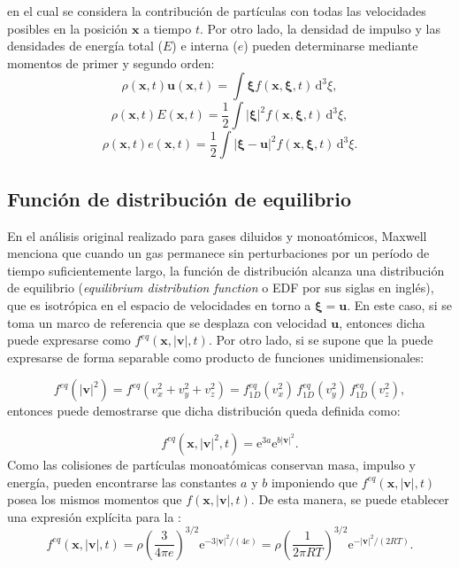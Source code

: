en el cual se considera la contribuci\'on de part\'iculas con todas las velocidades posibles en la posici\'on $\bm{x}$ a tiempo $t$. Por otro lado, la densidad de impulso y las densidades de energ\'ia total ($E$) e interna ($e$) pueden determinarse mediante momentos de primer y segundo orden:
\begin{equation}
	\rho(\bm{x},t) \bm{u}(\bm{x},t) = \int \bm{\xi} f(\bm{x},\bm{\xi},t) \, \mbox{d}^3 \xi,
\end{equation}
\begin{equation}
	\rho(\bm{x},t) E(\bm{x},t) = \dfrac{1}{2} \int |\bm{\xi}|^2 f(\bm{x},\bm{\xi},t) \, \mbox{d}^3 \xi,
\end{equation}
\begin{equation}
	\rho(\bm{x},t) e(\bm{x},t) = \dfrac{1}{2} \int |\bm{\xi}-\bm{u}|^2 f(\bm{x},\bm{\xi},t) \, \mbox{d}^3 \xi.
\end{equation}


\subsection{Funci\'on de distribuci\'on de equilibrio}
En el an\'alisis original realizado para gases diluidos y monoat\'omicos, Maxwell  menciona que cuando un gas permanece sin perturbaciones por un per\'iodo de tiempo suficientemente largo, la funci\'on de distribuci\'on \fvar{} alcanza una distribuci\'on de equilibrio \feqvar{} (\emph{equilibrium distribution function} o EDF por sus siglas en ingl\'es), que es isotr\'opica en el espacio de velocidades en torno a $\bm{\xi} = \bm{u}$. En este caso, si se toma un marco de referencia que se desplaza con velocidad $\bm{u}$, entonces dicha \edf{} puede expresarse como $f^{eq}(\bm{x},|\bm{v}|,t)$. Por otro lado, si se supone que la \edf{} puede expresarse de forma separable como producto de funciones unidimensionales:

\begin{equation}
	f^{eq}(|\bm{v}|^2) = f^{eq}(v_x^2 + v_y^2 + v_z^2)=f_{1D}^{eq}(v_x^2) \, f_{1D}^{eq}(v_y^2) \, f_{1D}^{eq}(v_z^2),
\end{equation}
entonces puede demostrarse que dicha distribuci\'on queda definida como:

\begin{equation}
	f^{eq}(\bm{x},|\bm{v}|^2,t) = \mbox{e}^{3a}\mbox{e}^{b|\bm{v}|^2}.
\end{equation}
Como las colisiones de part\'iculas monoat\'omicas conservan masa, impulso y energ\'ia, pueden encontrarse las constantes $a$ y $b$ imponiendo que $f^{eq}(\bm{x},|\bm{v}|,t)$ posea los mismos momentos que $f(\bm{x},|\bm{v}|,t)$. De esta manera, se puede etablecer una expresi\'on expl\'icita para la \edf{}:
\begin{equation}
	f^{eq}(\bm{x},|\bm{v}|,t) 
	= \rho \left( \dfrac{3}{4\pi e} \right)^{3/2} \mbox{e}^{-3|\bm{v}|^2/(4e)}
	= \rho \left( \dfrac{1}{2\pi RT} \right)^{3/2} \mbox{e}^{-|\bm{v}|^2/(2RT)}.
\end{equation}

